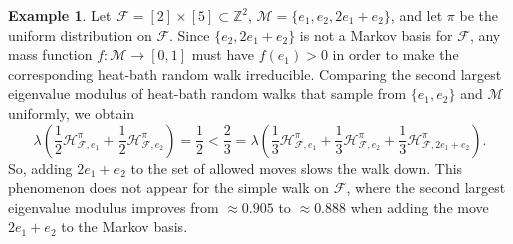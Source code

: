 \documentclass[11pt]{amsart}
\theoremstyle{definition}
\newtheorem{example}[thm]{Example}
\numberwithin{equation}{section}
\newcommand{\ring}[1]{\ensuremath{\mathbb{#1}}}
\renewcommand{\>}{\rangle}
\newcommand{\<}{\langle}
\newcommand{\0}{\mathbf{0}}
\newcommand{\1}{\mathbf{1}}
\newcommand{\2}{\mathbf{2}}
\newcommand\ZZ{\ring{Z}}
\newcommand\cF{{\mathcal F}}
\newcommand\cM{{\mathcal M}}
\newcommand{\heatbathmove}[3]{\mathcal{H}^{#1}_{#2,#3}}
\begin{document}
\begin{example}\label{ex:AddingMovesSlowingChain}
Let $\cF=[2]\times[5]\subset\ZZ^2$, $\cM=\{e_1,e_2,2e_1+e_2\}$, and let
$\pi$ be the uniform distribution on $\cF$.  Since $\{e_2,2e_1+e_2\}$ is
not a Markov basis for $\cF$, any mass function $f:\cM\to[0,1]$ must
have $f(e_1)>0$ in order to make the corresponding heat-bath random
walk irreducible. Comparing the second largest eigenvalue modulus of
heat-bath random walks that sample from $\{e_1,e_2\}$ and $\cM$
uniformly, we obtain
\begin{equation*}
\lambda\left(\frac{1}{2}\heatbathmove{\pi}{\cF}{e_1}+\frac{1}{2}\heatbathmove{\pi}{\cF}{e_2}\right)=\frac{1}{2}<
\frac{2}{3}=\lambda\left(\frac{1}{3}\heatbathmove{\pi}{\cF}{e_1}+\frac{1}{3}\heatbathmove{\pi}{\cF}{e_2}+\frac{1}{3}\heatbathmove{\pi}{\cF}{2e_1+e_2}\right).
\end{equation*}
So, adding $2e_1+e_2$ to the set of allowed moves slows the
walk down. This phenomenon does not appear for the simple walk on
$\cF$, where the second largest eigenvalue modulus improves from
$\approx 0.905$ to $\approx 0.888$ when adding the move $2e_1+e_2$ to
the Markov basis. 
\end{example}
\end{document}
